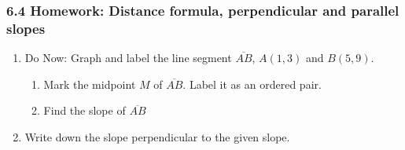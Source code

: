

\fancyhead[LE]{\thepage}



\subsubsection*{6.4 Homework: Distance formula, perpendicular and parallel slopes}
\begin{enumerate}
\item Do Now: Graph and label the line segment $\overline{AB}$, $A(1,3)$ and $B(5,9)$.
  \begin{multicols}{2}
    \begin{enumerate}
    \item Mark the midpoint $M$ of $\overline{AB}$. Label it as an ordered pair.  \vspace{1cm} 
    \item Find the slope of $\overline{AB}$
  \end{enumerate} \vspace{1cm}  
  \begin{center} %
    \end{center} 
  \end{multicols}

\item Write down the slope perpendicular to the given slope.
\begin{enumerate}
\end{enumerate}
\end{enumerate}
